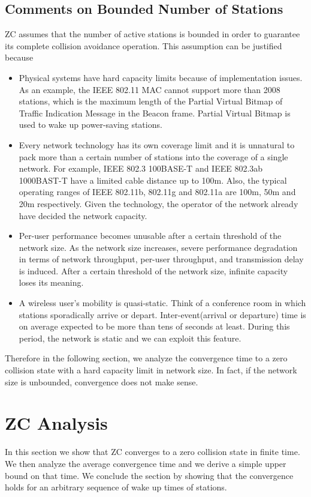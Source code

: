 \documentclass{acm_proc_article-sp}
\begin{document}
\subsection{Comments on Bounded Number of Stations}
ZC assumes that the number of active stations is bounded in order to guarantee its complete collision avoidance operation. This assumption can be justified because
\begin{itemize}
    \item   Physical systems have hard capacity limits because of implementation issues. As an example, the IEEE 802.11 MAC cannot support more than 2008 stations, which is the maximum length of the {Partial Virtual Bitmap} of {Traffic Indication Message} in {the Beacon frame}. Partial Virtual Bitmap is used to wake up power-saving stations.
    \item   Every network technology has its own coverage limit and it is unnatural to pack more than a certain number of stations into the coverage of a single network.
    For example, IEEE 802.3 100BASE-T and IEEE 802.3ab 1000BAST-T have a limited cable distance up to 100m. Also, the typical operating ranges of IEEE 802.11b, 802.11g and 802.11a are 100m, 50m and 20m respectively. Given the technology, the operator of the network already have decided the network capacity.
    \item   Per-user performance becomes unusable after a certain threshold of the network size. As the network size increases, severe performance degradation in terms of network throughput, per-user throughput, and transmission delay is induced. After a certain threshold of the network size, infinite capacity loses its meaning.
    \item   A wireless user's mobility is quasi-static. Think of a conference room in which stations sporadically arrive or depart. Inter-event(arrival or departure) time is on average expected to be more than tens of seconds at least. During this period, the network is static and we can exploit this feature.
\end{itemize}
Therefore in the following section, we analyze the convergence time to a zero collision state with a hard capacity limit in network size. In fact, if the network size is unbounded, convergence does not make sense.


\section{ZC Analysis}
\label{s.analysis}
In this section we show that ZC converges to a zero collision state in finite time. We then analyze the average convergence time and we derive a simple upper bound on that time. We conclude the section by showing that the convergence holds for an arbitrary sequence of wake up times of stations.
\end{document}
